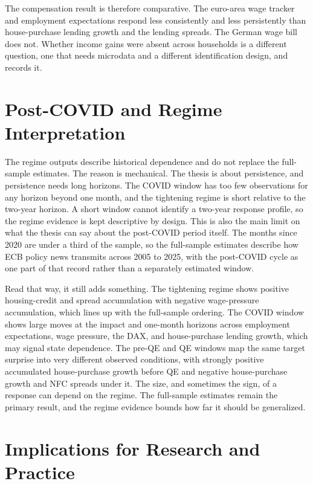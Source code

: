 The compensation result is therefore comparative. The euro-area wage tracker and employment expectations respond less consistently and less persistently than house-purchase lending growth and the lending spreads. The German wage bill does not. Whether income gains were absent across households is a different question, one that needs microdata and a different identification design, and  records it.

\section{Post-COVID and Regime Interpretation}

The regime outputs describe historical dependence and do not replace the full-sample estimates. The reason is mechanical. The thesis is about persistence, and persistence needs long horizons. The COVID window has too few observations for any horizon beyond one month, and the tightening regime is short relative to the two-year horizon. A short window cannot identify a two-year response profile, so the regime evidence is kept descriptive by design. This is also the main limit on what the thesis can say about the post-COVID period itself. The months since 2020 are under a third of the sample, so the full-sample estimates describe how ECB policy news transmits across 2005 to 2025, with the post-COVID cycle as one part of that record rather than a separately estimated window.

Read that way, it still adds something. The tightening regime shows positive housing-credit and spread accumulation with negative wage-pressure accumulation, which lines up with the full-sample ordering. The COVID window shows large moves at the impact and one-month horizons across employment expectations, wage pressure, the DAX, and house-purchase lending growth, which may signal state dependence. The pre-QE and QE windows map the same target surprise into very different observed conditions, with strongly positive accumulated house-purchase growth before QE and negative house-purchase growth and NFC spreads under it. The size, and sometimes the sign, of a response can depend on the regime. The full-sample estimates remain the primary result, and the regime evidence bounds how far it should be generalized.

\section{Implications for Research and Practice}

